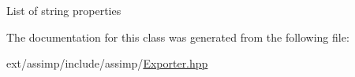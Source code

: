List of string properties 

The documentation for this class was generated from the following file\-:\begin{DoxyCompactItemize}
\item 
ext/assimp/include/assimp/\hyperlink{_exporter_8hpp}{Exporter.\-hpp}\end{DoxyCompactItemize}
